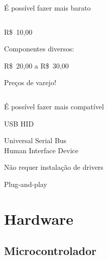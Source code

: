 \documentclass{beamer}
\begin{document}
\begin{frame}{É possível fazer mais barato}
\begin{columns}
\begin{center}
			R\$~10,00

			\pause
			\medskip

			Componentes diversos:

			R\$~20,00 a R\$~30,00

			\pause
			\medskip

			Preços de varejo!
		\end{center}
	\end{columns}
\end{frame}


\begin{frame}{É possível fazer mais compatível}
	\begin{center}
		\pause

		{\LARGE USB HID}

		\medskip

		Universal Serial Bus \\
		Human Interface Device

		\pause
		\bigskip

		Não requer instalação de drivers

		\medskip

		Plug-and-play
	\end{center}
\end{frame}


\section{Hardware}

\subsection{Microcontrolador}
\end{document}
